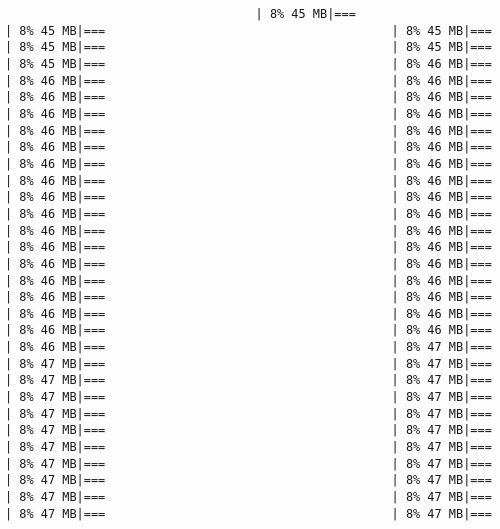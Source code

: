 \documentclass[
]{article}
\begin{document}
\begin{verbatim}
                                   | 8% 45 MB|===                                        | 8% 45 MB|===                                        | 8% 45 MB|===                                        | 8% 45 MB|===                                        | 8% 45 MB|===                                        | 8% 45 MB|===                                        | 8% 46 MB|===                                        | 8% 46 MB|===                                        | 8% 46 MB|===                                        | 8% 46 MB|===                                        | 8% 46 MB|===                                        | 8% 46 MB|===                                        | 8% 46 MB|===                                        | 8% 46 MB|===                                        | 8% 46 MB|===                                        | 8% 46 MB|===                                        | 8% 46 MB|===                                        | 8% 46 MB|===                                        | 8% 46 MB|===                                        | 8% 46 MB|===                                        | 8% 46 MB|===                                        | 8% 46 MB|===                                        | 8% 46 MB|===                                        | 8% 46 MB|===                                        | 8% 46 MB|===                                        | 8% 46 MB|===                                        | 8% 46 MB|===                                        | 8% 46 MB|===                                        | 8% 46 MB|===                                        | 8% 46 MB|===                                        | 8% 46 MB|===                                        | 8% 46 MB|===                                        | 8% 46 MB|===                                        | 8% 46 MB|===                                        | 8% 46 MB|===                                        | 8% 46 MB|===                                        | 8% 46 MB|===                                        | 8% 46 MB|===                                        | 8% 46 MB|===                                        | 8% 46 MB|===                                        | 8% 47 MB|===                                        | 8% 47 MB|===                                        | 8% 47 MB|===                                        | 8% 47 MB|===                                        | 8% 47 MB|===                                        | 8% 47 MB|===                                        | 8% 47 MB|===                                        | 8% 47 MB|===                                        | 8% 47 MB|===                                        | 8% 47 MB|===                                        | 8% 47 MB|===                                        | 8% 47 MB|===                                        | 8% 47 MB|===                                        | 8% 47 MB|===                                        | 8% 47 MB|===                                        | 8% 47 MB|===                                        | 8% 47 MB|===                                        | 8% 47 MB|===                                        | 8% 47 MB|===                                        | 8% 47 MB|===                                        | 8% 47 MB|===                              
\end{verbatim}
\end{document}
